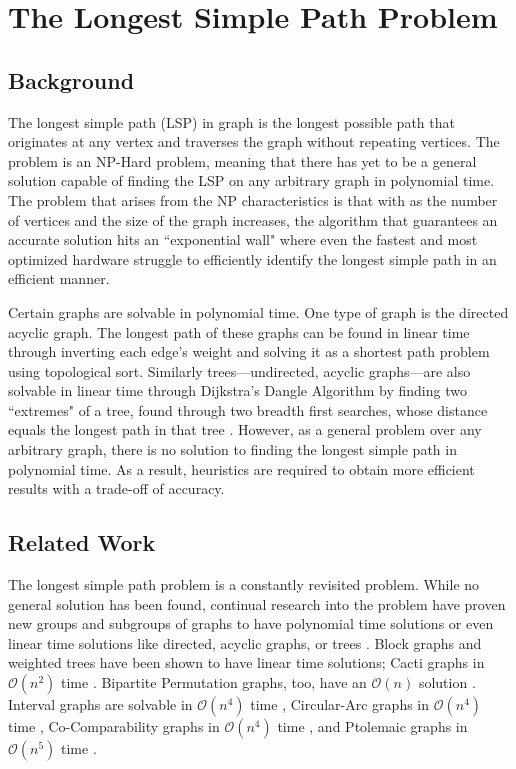 \documentclass[twocolumn,showpacs,%
  nofootinbib,aps,superscriptaddress,%
  eqsecnum,prd,notitlepage,showkeys,11pt]{article}
\begin{document}
\section{\centering The Longest Simple Path Problem}
\subsection{Background}
The longest simple path (LSP) in graph is the longest possible path that originates at any vertex and traverses the graph without repeating vertices. The problem is an NP-Hard problem, meaning that there has yet to be a general solution capable of finding the LSP on any arbitrary graph in polynomial time. The problem that arises from the NP characteristics is that with as the number of vertices and the size of the graph increases, the algorithm that guarantees an accurate solution hits an ``exponential wall" where even the fastest and most optimized hardware struggle to efficiently identify the longest simple path in an efficient manner.

Certain graphs are solvable in polynomial time. One type of graph is the directed acyclic graph. The longest path of these graphs can be found in linear time through inverting each edge's weight and solving it as a shortest path problem using topological sort. Similarly trees---undirected, acyclic graphs---are also solvable in linear time through Dijkstra's Dangle Algorithm by finding two ``extremes" of a tree, found through two breadth first searches, whose distance equals the longest path in that tree \cite{club2002computing}. However, as a general problem over any arbitrary graph, there is no solution to finding the longest simple path in polynomial time. As a result, heuristics are required to obtain more efficient results with a trade-off of accuracy.

\subsection{Related Work} 
The longest simple path problem is a constantly revisited problem. While no general solution has been found, continual research into the problem have proven new groups and subgroups of graphs to have polynomial time solutions or even linear time solutions like directed, acyclic graphs, or trees \cite{club2002computing}. Block graphs and weighted trees have been shown to have linear time solutions; Cacti graphs in $\mathcal{O}(n^2)$ time \cite{uehara2004efficient, uehara2007computing}. Bipartite Permutation graphs, too, have an $\mathcal{O}(n)$ solution \cite{uehara2007linear}. Interval graphs are solvable in $\mathcal{O}(n^4)$ time \cite{ioannidou2009longest,  giannopoulou2015polynomial}, Circular-Arc graphs in $\mathcal{O}(n^4)$ time \cite{mertzios2011computing}, Co-Comparability graphs in $\mathcal{O}(n^4)$ time \cite{mertzios2012simple}, and Ptolemaic graphs in $\mathcal{O}(n^5)$ time \cite{takahara2008longest}.
\end{document}
